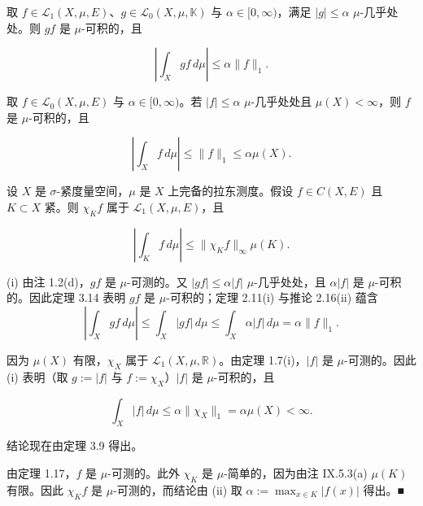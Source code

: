 \begin{corollary}

\begin{subitems}
\item

取 $ f \in \mathcal{L}_1(X,\mu,E) $、$ g \in \mathcal{L}_0(X,\mu,\mathbb{K}) $ 与 $ \alpha \in [0,\infty) $，满足 $ |g| \le \alpha $ $ \mu $-几乎处处。则 $ gf $ 是 $ \mu $-可积的，且

\[
\left| \int_X gf \, d\mu \right| \le \alpha \|f\|_1.
\]
\item

取 $ f \in \mathcal{L}_0(X,\mu,E) $ 与 $ \alpha \in [0,\infty) $。若 $ |f| \le \alpha $ $ \mu $-几乎处处且 $ \mu(X) < \infty $，则 $ f $ 是 $ \mu $-可积的，且

\[
\left| \int_X f \, d\mu \right| \le \|f\|_1 \le \alpha\mu(X).
\]
\item

设 $ X $ 是 $ \sigma $-紧度量空间，$ \mu $ 是 $ X $ 上完备的拉东测度。假设 $ f \in C(X,E) $ 且 $ K \subset X $ 紧。则 $ \chi_K f $ 属于 $ \mathcal{L}_1(X,\mu,E) $，且

\[
\left| \int_K f \, d\mu \right| \le \|\chi_K f\|_\infty \mu(K).
\]

\proofhead
(i) 由注 1.2(d)，$ gf $ 是 $ \mu $-可测的。又 $ |gf| \le \alpha|f| $ $ \mu $-几乎处处，且 $ \alpha|f| $ 是 $ \mu $-可积的。因此定理 3.14 表明 $ gf $ 是 $ \mu $-可积的；定理 2.11(i) 与推论 2.16(ii) 蕴含
\[
\left| \int_X gf \, d\mu \right| \le \int_X |gf| \, d\mu \le \int_X \alpha|f| \, d\mu = \alpha\|f\|_1.
\]
\end{subitems}

\begin{subitems}
\item[（ii）]

因为 $ \mu(X) $ 有限，$ \chi_X $ 属于 $ \mathcal{L}_1(X,\mu,\mathbb{R}) $。由定理 1.7(i)，$ |f| $ 是 $ \mu $-可测的。因此 (i) 表明（取 $ g := |f| $ 与 $ f := \chi_X $）$ |f| $ 是 $ \mu $-可积的，且

\[
\int_X |f| \, d\mu \le \alpha\|\chi_X\|_1 = \alpha\mu(X) < \infty.
\]

结论现在由定理 3.9 得出。

\item[（iii）]

由定理 1.17，$ f $ 是 $ \mu $-可测的。此外 $ \chi_K $ 是 $ \mu $-简单的，因为由注 IX.5.3(a) $ \mu(K) $ 有限。因此 $ \chi_K f $ 是 $ \mu $-可测的，而结论由 (ii) 取 $ \alpha := \max_{x \in K}|f(x)| $ 得出。\nobreak\hspace{0.35em}■

\end{subitems}

\end{corollary}

